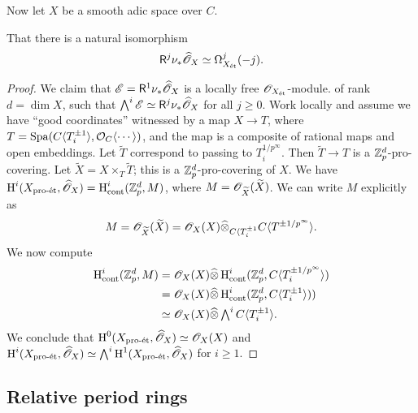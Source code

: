 Now let $X$ be a smooth adic space over $C$. 

\begin{lemma}
That there is a natural isomorphism 
\[
  \mathsf R^j \nu_\ast \widehat{\mathscr{O}}_X \simeq \Omega_{X_{\textnormal{\'et}}}^j(-j) .
\]
\end{lemma}
\begin{proof}
We claim that $\mathscr E=\mathsf R^1 \nu_\ast \widehat{\mathscr{O}}_X$ is a locally free 
$\mathscr{O}_{X_{\textnormal{\'et}}}$-module. of rank $d=\dim X$, such that 
$\bigwedge^i \mathscr E\simeq \mathsf R^j \nu_\ast \widehat{\mathscr{O}}_X$ for all 
$j\geqslant 0$. Work locally and assume we have ``good coordinates'' witnessed by a 
map $X\to T$, where $T=\operatorname{Spa}(C\langle T^{\pm 1}_i\rangle, \mathcal{O}_C\langle \cdots\rangle)$, 
and the map is a composite of rational maps and open embeddings. 
Let $\widetilde T$ correspond to passing to $T_i^{1/p^\infty}$. Then 
$\widetilde T \to T$ is a $\mathbb{Z}_p^d$-pro-covering. 
Let $\widetilde X=X\times_T \widetilde T$; this is a $\mathbb{Z}_p^d$-pro-covering of $X$. 
We have $\operatorname{H}^i(X_{\textnormal{pro-\'et}},\widehat{\mathscr{O}}_X) = \operatorname{H}^i_\text{cont}(\mathbb{Z}_p^d,M)$, where 
$M=\mathscr{O}_{\widetilde X}(\widetilde X)$. We can write $M$ explicitly as 
\[
  M = \mathscr{O}_{\widetilde X}(\widetilde X) = \mathscr{O}_X(X)\widehat\otimes_{C\langle T^{\pm 1}_i} C\langle T^{\pm 1/p^\infty} \rangle .
\]
We now compute 
\begin{align*}
  \operatorname{H}_\text{cont}^i(\mathbb{Z}_p^d,M) 
    &= \mathscr{O}_X(X)\widehat\otimes \operatorname{H}_\text{cont}^i(\mathbb{Z}_p^d,C\langle T_i^{\pm 1/p^\infty}\rangle) \\
    &= \mathscr{O}_X(X)\widehat\otimes \operatorname{H}_\text{cont}^i(\mathbb{Z}_p^d,C\langle T_i^{\pm 1}\rangle)) \\
    &\simeq \mathscr{O}_X(X)\widehat\otimes \textstyle\bigwedge^i C\langle T_i^{\pm 1}\rangle .
\end{align*}
We conclude that $\operatorname{H}^0(X_{\textnormal{pro-\'et}},\widehat{\mathscr{O}}_X) \simeq \mathscr{O}_X(X)$ and 
$\operatorname{H}^i(X_{\textnormal{pro-\'et}},\widehat{\mathscr{O}}_X) \simeq \bigwedge^i\operatorname{H}^1(X_{\textnormal{pro-\'et}},\widehat{\mathscr{O}}_X)$ 
for $i\geqslant 1$. 
\end{proof}





\subsection{Relative period rings}


